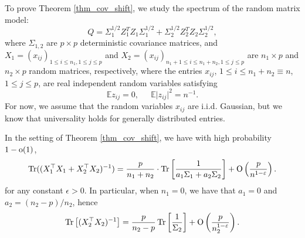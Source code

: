 \bigskip
To prove Theorem \ref{thm_cov_shift}, we study the spectrum of the random matrix model:
$$Q= \Sigma_1^{1/2}  Z_1^T Z_1 \Sigma_1^{1/2}  + \Sigma_2^{1/2}  Z_2^T Z_2 \Sigma_2^{1/2} ,$$
where $\Sigma_{1,2}$ are $p\times p$ deterministic covariance matrices, and $X_1=(x_{ij})_{1\le i \le n_1, 1\le j \le p}$ and $X_2=(x_{ij})_{n_1+1\le i \le n_1+n_2, 1\le j \le p}$ are $n_1\times p$ and $n_2 \times p$ random matrices, respectively, where the entries $x_{ij}$, $1 \leq i \leq n_1+n_2\equiv n$, $1 \leq j \leq p$, are real independent random variables satisfying
\begin{equation}\label{eq_12moment} %
\mathbb{E} z_{ij} =0, \ \quad \ \mathbb{E} \vert z_{ij} \vert^2  = n^{-1}.
\end{equation} 
For now, we assume that the random variables $x_{ij}$ are i.i.d. Gaussian, but we know that universality holds for generally distributed entries. %


\begin{lemma}\label{lem_cov_shift}
	In the setting of Theorem \ref{thm_cov_shift}, we have with high probability $1-{\rm o}(1)$,
\begin{align*}
\operatorname{Tr} ((X_1^{\top}X_1 + X_2^{\top}X_2)^{-1}) = \frac{p}{n_1+n_2}\cdot \operatorname{Tr} \left[ \frac{1}{a_1\Sigma_1 + a_2\Sigma_2} \right] +\operatorname{O}\left(\frac{p}{n^{1-\varepsilon}}\right).
\end{align*}
	for any constant $\epsilon>0$. %
	In particular, when $n_1 = 0$, we have that $a_1 = 0$ and $a_2 = (n_2-p) / n_2$, hence
	\[ \operatorname{Tr}\left[(X_2^{\top}X_2)^{-1}\right] = \frac{p}{n_2-p}\operatorname{Tr}\left[\frac 1 {\Sigma_2}\right] + \operatorname{O}\left(\frac{p}{n_2^{1-\varepsilon}}\right). \]
\end{lemma}

